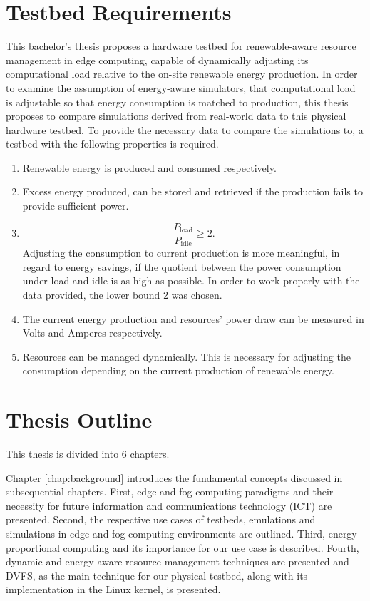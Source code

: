 \section{Testbed Requirements}
\label{sec:testbed_requirements}

This bachelor's thesis proposes a hardware testbed for renewable-aware resource
management in edge computing, capable of dynamically adjusting its computational
load relative to the on-site renewable energy production. In order to examine
the assumption of energy-aware simulators, that computational load is adjustable
so that energy consumption is matched to production, this thesis proposes to
compare simulations derived from real-world data to this physical hardware
testbed. To provide the necessary data to compare the simulations to, a testbed
with the following properties is required.

\begin{enumerate}
    \item Renewable energy is produced and consumed respectively.
    \item Excess energy produced, can be stored and retrieved if the production
        fails to provide sufficient power.
    \item \[ \frac{P_{\text{load}}}{P_{\text{idle}}} \geq 2 .\]
        Adjusting the consumption to current production is more meaningful, in
        regard to energy savings, if the quotient between the power consumption
        under load and idle is as high as possible. In order to work properly
        with the data provided, the lower bound 2 was chosen.
    \item The current energy production and resources' power draw can be
        measured in Volts and Amperes respectively.
    \item Resources can be managed dynamically. This is necessary for adjusting
        the consumption depending on the current production of renewable energy.
\end{enumerate}

\section{Thesis Outline}

This thesis is divided into 6 chapters.

Chapter \ref{chap:background} introduces the fundamental concepts discussed in
subsequential chapters. First, edge and fog computing paradigms and their
necessity for future information and communications technology (ICT) are
presented. Second, the respective use cases of testbeds, emulations and
simulations in edge and fog computing environments are outlined. Third, energy
proportional computing and its importance for our use case is described. Fourth,
dynamic and energy-aware resource management techniques are presented and DVFS,
as the main technique for our physical testbed, along with its implementation in
the Linux kernel, is presented.


